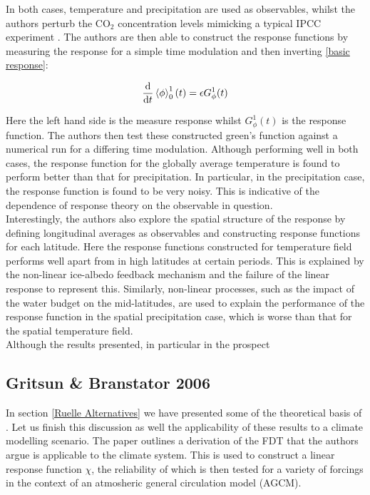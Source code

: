 \noindent In both cases, temperature and precipitation are used as observables, whilst the authors perturb the $\text{CO}_2$ concentration levels mimicking a typical IPCC experiment \cite{Change2014}. The authors are then able to construct the response functions by measuring the response for a simple time modulation and then inverting \ref{basic response}:

\begin{align}
\dv{t} \expval{\phi}_0^1(t) = \epsilon G_\phi ^1 (t)
\end{align} 

\noindent Here the left hand side is the measure response whilst $G_\phi ^1 (t)$ is the response function. The authors then test these constructed green's function against a numerical run for a differing time modulation. Although performing well in both cases, the response function for the globally average temperature is found to perform better than that for precipitation. In particular, in the precipitation case, the response function is found to be very noisy. This is indicative of the dependence of response theory on the observable in question. \\

\noindent Interestingly, the authors also explore the spatial structure of the response by defining longitudinal averages as observables and constructing response functions for each latitude. Here the response functions constructed for temperature field performs well apart from in high latitudes at certain periods. This is explained by the non-linear ice-albedo feedback mechanism and the failure of the linear response to represent this. Similarly, non-linear processes, such as the impact of the water budget on the mid-latitudes, are used to explain the performance of the response function in the spatial precipitation case, which is worse than that for the spatial temperature field.\\

\noindent Although the results presented, in particular in the prospect 

\subsection{Gritsun \& Branstator 2006}

In section \ref{Ruelle Alternatives} we have presented some of the theoretical basis of \cite{Gritsun2007}. Let us finish this discussion as well the applicability of these results to a climate modelling scenario. The paper outlines a derivation of the FDT that the authors argue is applicable to the climate system. This is used to construct a linear response function $\chi$, the reliability of which is then tested for a variety of forcings in the context of an atmosheric general circulation model (AGCM). \\

